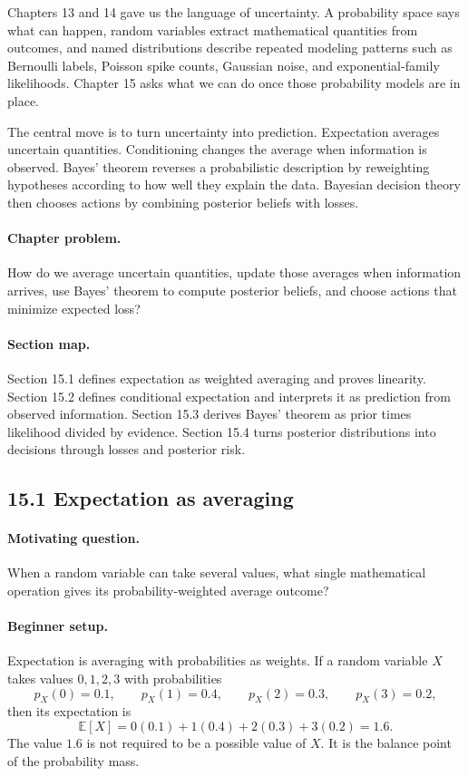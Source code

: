 Chapters 13 and 14 gave us the language of uncertainty. A probability space says what can happen, random variables extract mathematical quantities from outcomes, and named distributions describe repeated modeling patterns such as Bernoulli labels, Poisson spike counts, Gaussian noise, and exponential-family likelihoods. Chapter 15 asks what we can do once those probability models are in place.

The central move is to turn uncertainty into prediction. Expectation averages uncertain quantities. Conditioning changes the average when information is observed. Bayes' theorem reverses a probabilistic description by reweighting hypotheses according to how well they explain the data. Bayesian decision theory then chooses actions by combining posterior beliefs with losses.

\paragraph{Chapter problem.}
How do we average uncertain quantities, update those averages when information arrives, use Bayes' theorem to compute posterior beliefs, and choose actions that minimize expected loss?

\paragraph{Section map.}
Section 15.1 defines expectation as weighted averaging and proves linearity. Section 15.2 defines conditional expectation and interprets it as prediction from observed information. Section 15.3 derives Bayes' theorem as prior times likelihood divided by evidence. Section 15.4 turns posterior distributions into decisions through losses and posterior risk.

\subsection{15.1 Expectation as averaging}

\paragraph{Motivating question.}
When a random variable can take several values, what single mathematical operation gives its probability-weighted average outcome?

\paragraph{Beginner setup.}
Expectation is averaging with probabilities as weights. If a random variable \(X\) takes values \(0,1,2,3\) with probabilities
\[
p_X(0)=0.1,\qquad p_X(1)=0.4,\qquad p_X(2)=0.3,\qquad p_X(3)=0.2,
\]
then its expectation is
\[
\mathbb{E}[X]
=0(0.1)+1(0.4)+2(0.3)+3(0.2)
=1.6.
\]
The value \(1.6\) is not required to be a possible value of \(X\). It is the balance point of the probability mass.

